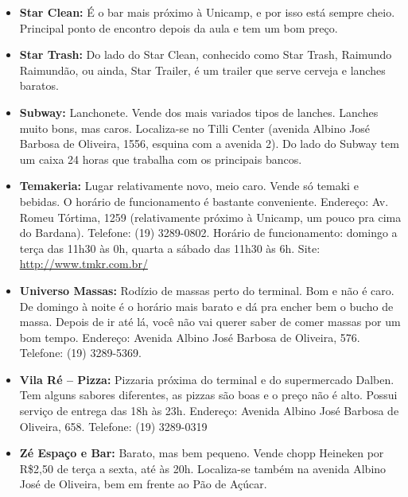 \begin{itemize}
\item  \textbf{Star Clean:} É o bar mais próximo à Unicamp, e por isso está sempre cheio. Principal ponto de encontro depois da aula e tem um bom preço.
\end{itemize}

\begin{itemize}
\item  \textbf{Star Trash:} Do lado do Star Clean, conhecido como Star Trash, Raimundo Raimundão, ou ainda, Star Trailer, é um trailer que serve cerveja e lanches baratos.
\end{itemize}

\begin{itemize}
\item  \textbf{Subway:} Lanchonete. Vende dos mais variados tipos de lanches. Lanches muito bons, mas caros. Localiza-se no Tilli Center (avenida Albino José Barbosa de Oliveira, 1556, esquina com a avenida 2). Do lado do Subway tem um caixa 24 horas que trabalha com os principais bancos.
\end{itemize}

\begin{itemize}
\item  \textbf{Temakeria:} Lugar relativamente novo, meio caro. Vende só temaki e bebidas. O horário de funcionamento é bastante conveniente. Endereço: Av. Romeu Tórtima, 1259 (relativamente próximo à Unicamp, um pouco pra cima do Bardana). Telefone: (19) 3289-0802. Horário de funcionamento: domingo a terça das 11h30 às 0h, quarta a sábado das 11h30 às 6h. Site: \url{http://www.tmkr.com.br/}
\end{itemize}

\begin{itemize}
\item  \textbf{Universo Massas:} Rodízio de massas perto do terminal. Bom e não é caro. De domingo à noite é o horário mais barato e dá pra encher bem o bucho de massa. Depois de ir até lá, você não vai querer saber de comer massas por um bom tempo. Endereço: Avenida Albino José Barbosa de Oliveira, 576. Telefone: (19) 3289-5369.
\end{itemize}

\begin{itemize}
\item  \textbf{Vila Ré -- Pizza:} Pizzaria próxima do terminal e do supermercado Dalben. Tem alguns sabores diferentes, as pizzas são boas e o preço não é alto. Possui serviço de entrega das 18h às 23h. Endereço: Avenida Albino José Barbosa de Oliveira, 658. Telefone: (19) 3289-0319
\end{itemize}

\begin{itemize}
\item  \textbf{Zé Espaço e Bar:} Barato, mas bem pequeno. Vende chopp Heineken por R\$2,50 de terça a sexta, até às 20h. Localiza-se também na avenida Albino José de Oliveira, bem em frente ao Pão de Açúcar.
\end{itemize}
